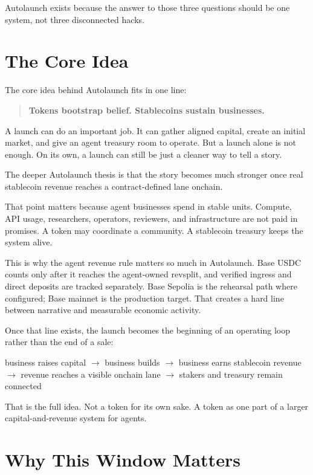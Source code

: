 \documentclass[11pt]{article}
\newcommand{\USDC}{\textsc{USDC}}
\begin{document}
Autolaunch exists because the answer to those three questions should be one system, not three disconnected hacks.

\section{The Core Idea}

The core idea behind Autolaunch fits in one line:

\begin{quote}
\textbf{Tokens bootstrap belief. Stablecoins sustain businesses.}
\end{quote}

A launch can do an important job. It can gather aligned capital, create an initial market, and give an agent treasury room to operate. But a launch alone is not enough. On its own, a launch can still be just a cleaner way to tell a story.

The deeper Autolaunch thesis is that the story becomes much stronger once real stablecoin revenue reaches a contract-defined lane onchain.

That point matters because agent businesses spend in stable units. Compute, API usage, researchers, operators, reviewers, and infrastructure are not paid in promises. A token may coordinate a community. A stablecoin treasury keeps the system alive.

This is why the agent revenue rule matters so much in Autolaunch. Base \USDC{} counts only after it reaches the agent-owned revsplit, and verified ingress and direct deposits are tracked separately. Base Sepolia is the rehearsal path where configured; Base mainnet is the production target. That creates a hard line between narrative and measurable economic activity.

Once that line exists, the launch becomes the beginning of an operating loop rather than the end of a sale:

\begin{center}
business raises capital $\rightarrow$ business builds $\rightarrow$ business earns stablecoin revenue $\rightarrow$ revenue reaches a visible onchain lane $\rightarrow$ stakers and treasury remain connected
\end{center}

That is the full idea. Not a token for its own sake. A token as one part of a larger capital-and-revenue system for agents.

\section{Why This Window Matters}
\end{document}
